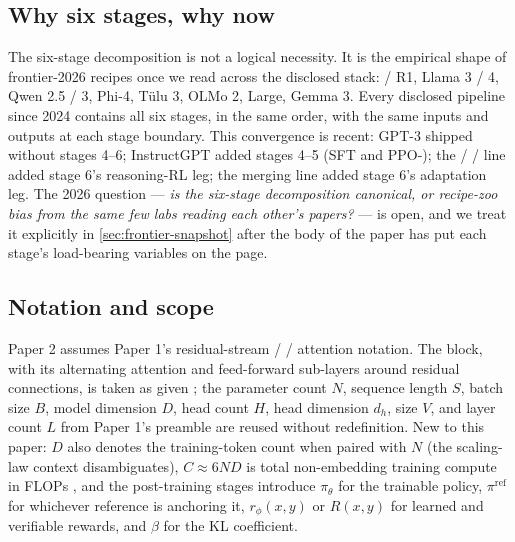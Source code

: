 \subsection{Why six stages, why now}
\label{sec:intro-six}

The six-stage decomposition is not a logical necessity. It is the
empirical shape of frontier-2026 recipes once we read across the
disclosed stack:  / R1, Llama 3 / 4, Qwen 2.5 / 3, Phi-4,
T\"ulu 3, OLMo 2,  Large, Gemma 3. Every disclosed pipeline
since 2024 contains all six stages, in the same order, with the same
inputs and outputs at each stage boundary. This convergence is recent:
GPT-3 \citep{kaplan2020} shipped without stages 4--6; InstructGPT
\citep{ouyang2022-instructgpt} added stages 4--5 (SFT and PPO-);
the  /  /  line \citep{shao2024,deepseek-r1,dapo2025} added
stage 6's reasoning-RL leg; the merging line
\citep{wortsman2022-model-soups,ilharco2022-task-vectors,yadav2023-ties-merging}
added stage 6's adaptation leg. The 2026 question --- \emph{is the
six-stage decomposition canonical, or recipe-zoo bias from the same few
labs reading each other's papers?} --- is open, and we treat it
explicitly in \cref{sec:frontier-snapshot} after the body of the paper
has put each stage's load-bearing variables on the page.

\subsection{Notation and scope}
\label{sec:intro-notation}

Paper 2 assumes Paper 1's residual-stream /  / attention notation.
The  block, with its alternating attention and feed-forward
sub-layers around residual connections, is taken as given
\citep{vaswani2017}; the parameter count $N$, sequence length $S$,
batch size $B$, model dimension $D$, head count $H$, head dimension
$d_h$,  size $V$, and layer count $L$ from Paper 1's
preamble are reused without redefinition. New to this paper: $D$ also
denotes the training-token count when paired with $N$ (the scaling-law
context disambiguates), $C \approx 6ND$ is total non-embedding training
compute in FLOPs \citep[\S 2.1]{kaplan2020}, and the post-training
stages introduce $\pi_\theta$ for the trainable policy,
$\pi^{\mathrm{ref}}$ for whichever reference is anchoring it,
$r_\phi(x,y)$ or $R(x,y)$ for learned and verifiable rewards, and
$\beta$ for the KL coefficient.

